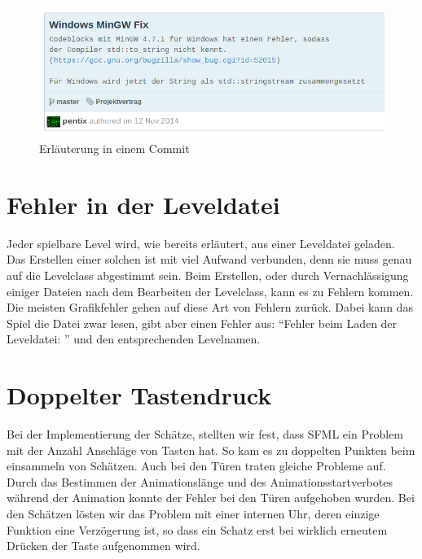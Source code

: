 \documentclass[11pt,a4paper]{scrbook}
\newcommand{\q}[1]{``#1''}
\begin{document}
\begin{figure}[h]
\centering
\includegraphics[scale=0.8]{img/e419eef.png}
\caption{Erläuterung in einem Commit}
\end{figure}

\section{Fehler in der Leveldatei}
Jeder spielbare Level wird, wie bereits erläutert, aus einer Leveldatei geladen.
Das Erstellen einer solchen ist mit viel Aufwand verbunden, denn sie muss genau auf die Levelclass abgestimmt sein.
Beim Erstellen, oder durch Vernachlässigung einiger Dateien nach dem Bearbeiten der Levelclass, kann es zu Fehlern kommen.
Die meisten Grafikfehler gehen auf diese Art von Fehlern zurück.
Dabei kann das Spiel die Datei zwar lesen, gibt aber einen Fehler aus: \q{Fehler beim Laden der Leveldatei: } und den entsprechenden Levelnamen.


\section{Doppelter Tastendruck}
Bei der Implementierung der Schätze, stellten wir fest, dass SFML ein Problem mit der Anzahl Anschläge von Tasten hat.
So kam es zu doppelten Punkten beim einsammeln von Schätzen.
Auch bei den Türen traten gleiche Probleme auf. Durch das Bestimmen der Animationslänge und des Animationsstartverbotes während der Animation konnte der Fehler bei den Türen aufgehoben wurden.
Bei den Schätzen lösten wir das Problem mit einer internen Uhr, deren einzige Funktion eine Verzögerung ist, so dass ein Schatz erst bei wirklich erneutem Drücken der Taste aufgenommen wird.
\end{document}
